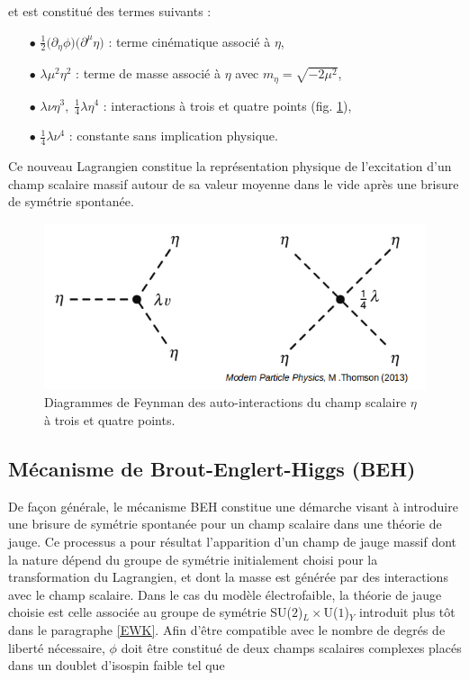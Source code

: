         et est constitué des termes suivants :

        \begin{enumerate}
            \item[$\bullet$] $\frac{1}{2}\bigl(\partial_{\eta}\phi\bigr)\bigl(\partial^{\mu}\eta\bigr)$ : terme cinématique associé à $\eta$,
            \item[$\bullet$] $\lambda\mu^2\eta^2$ : terme de masse associé à $\eta$ avec $m_{\eta}=\sqrt{-2\mu^2}$,
            \item[$\bullet$] $\lambda\nu\eta^3,\;\frac{1}{4}\lambda\eta^4$ : interactions à trois et quatre points (fig. \ref{higgsVtx}),
            \item[$\bullet$] $\frac{1}{4}\lambda\nu^4$ : constante sans implication physique.
        \end{enumerate}

        Ce nouveau Lagrangien constitue la représentation physique de l'excitation d'un champ scalaire massif autour de sa valeur moyenne dans le vide après une brisure de symétrie spontanée.

        \begin{figure}
        \centering
            \includegraphics[scale=0.45]{Chapitre2/Images/higgsVtx.png} 
            \caption{Diagrammes de Feynman des auto-interactions du champ scalaire $\eta$ à trois et quatre points.}
        \label{higgsVtx}
        \end{figure}

        \subsection{Mécanisme de Brout-Englert-Higgs (BEH)}
        \label{higgsmeca}

        De façon générale, le mécanisme BEH constitue une démarche visant à introduire une brisure de symétrie spontanée pour un champ scalaire dans une théorie de jauge. Ce processus a pour résultat l'apparition d'un champ de jauge massif dont la nature dépend du groupe de symétrie initialement choisi pour la transformation du Lagrangien, et dont la masse est générée par des interactions avec le champ scalaire. Dans le cas du modèle électrofaible, la théorie de jauge choisie est celle associée au groupe de symétrie SU($2$)$_L\times$U($1$)$_Y$ introduit plus tôt dans le paragraphe \ref{EWK}. Afin d'être compatible avec le nombre de degrés de liberté nécessaire, $\phi$ doit être constitué de deux champs scalaires complexes placés dans un doublet d'isospin faible tel que 

